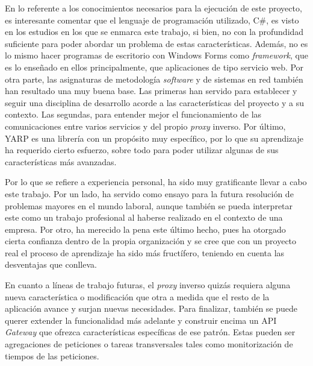 \documentclass[11pt,spanish,listoffigures]{tfgetsinf}
\begin{document}
En lo referente a los conocimientos necesarios para la ejecución de este proyecto, es interesante comentar que el lenguaje de programación utilizado, C\#, es visto en los estudios en los que se enmarca este trabajo, si bien, no con la profundidad suficiente para poder abordar un problema de estas características. Además, no es lo mismo hacer programas de escritorio con Windows Forms \cite{WinForms} como \emph{framework}, que es lo enseñado en ellos principalmente, que aplicaciones de tipo servicio web. Por otra parte, las asignaturas de metodología \emph{software} y de sistemas en red también han resultado una muy buena base. Las primeras han servido para establecer y seguir una disciplina de desarrollo acorde a las características del proyecto y a su contexto. Las segundas, para entender mejor el funcionamiento de las comunicaciones entre varios servicios y del propio \emph{proxy} inverso. Por último, YARP es una librería con un propósito muy específico, por lo que su aprendizaje ha requerido cierto esfuerzo, sobre todo para poder utilizar algunas de sus características más avanzadas.

Por lo que se refiere a experiencia personal, ha sido muy gratificante llevar a cabo este trabajo. Por un lado, ha servido como ensayo para la futura resolución de problemas mayores en el mundo laboral, aunque también se pueda interpretar este como un trabajo profesional al haberse realizado en el contexto de una empresa. Por otro, ha merecido la pena este último hecho, pues ha otorgado cierta confianza dentro de la propia organización y se cree que con un proyecto real el proceso de aprendizaje ha sido más fructífero, teniendo en cuenta las desventajas que conlleva.

En cuanto a líneas de trabajo futuras, el \emph{proxy} inverso quizás requiera alguna nueva característica o modificación que otra a medida que el resto de la aplicación avance y surjan nuevas necesidades. Para finalizar, también se puede querer extender la funcionalidad más adelante y construir encima un API \emph{Gateway} que ofrezca características específicas de ese patrón. Estas pueden ser agregaciones de peticiones o tareas transversales tales como monitorización de tiempos de las peticiones.


\renewcommand{\bibname}{Referencias}
\end{document}
